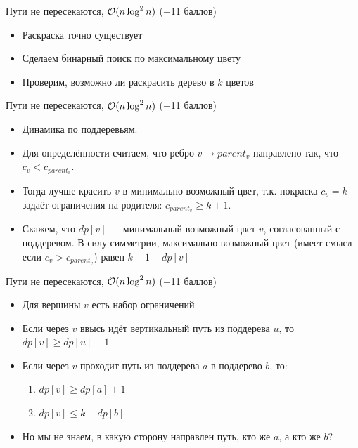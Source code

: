 \begin{frame}{Пути не пересекаются, $\mathcal{O}(n \log^2 n)$ (+11 баллов)}
  \begin{itemize}
    \item Раскраска точно существует
    \item Сделаем бинарный поиск по максимальному цвету
    \item Проверим, возможно ли раскрасить дерево в $k$ цветов
  \end{itemize}
\end{frame}

\begin{frame}{Пути не пересекаются, $\mathcal{O}(n \log^2 n)$ (+11 баллов)}
  \begin{itemize}
    \vspace{-1em}
  \item Динамика по поддеревьям.
  \item Для определённости считаем, что ребро $v \rightarrow parent_v$ направлено так, что $c_v < c_{parent_v}$.
  \item Тогда лучше красить $v$ в минимально возможный цвет, т.к. покраска $c_v = k$ задаёт ограничения на родителя:
    $c_{parent_v} \ge k + 1$.
  \item Скажем, что $dp[v]$ --- минимальный возможный цвет $v$, согласованный с поддеревом.
    В силу симметрии, максимально возможный цвет (имеет смысл если $c_v > c_{parent_v}$) равен $k + 1 - dp[v]$
  \end{itemize}
\end{frame}

\begin{frame}{Пути не пересекаются, $\mathcal{O}(n \log^2 n)$ (+11 баллов)}
  \begin{itemize}
    \item Для вершины $v$ есть набор ограничений
    \item Если через $v$ ввысь идёт вертикальный путь из поддерева $u$, то $dp[v] \ge dp[u] + 1$
    \item Если через $v$ проходит путь из поддерева $a$ в поддерево $b$, то:
    \begin{enumerate}
        \item $dp[v] \ge dp[a] + 1$
        \item $dp[v] \le k - dp[b]$
    \end{enumerate}
    \item Но мы не знаем, в какую сторону направлен путь, кто же $a$, а кто же $b$?
  \end{itemize}
\end{frame}

